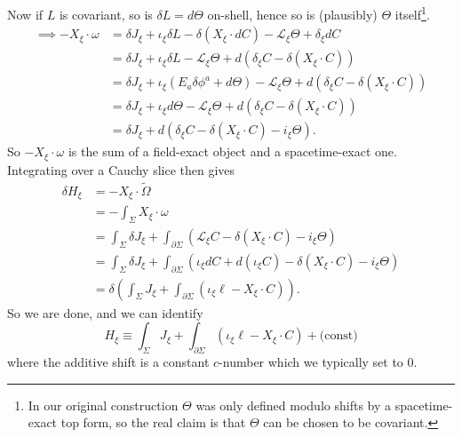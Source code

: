 \documentclass[11pt,letterpaper]{article}
\newcommand{\LP}{\left(}
\newcommand{\RP}{\right)}
\newcommand{\mc}[1]{\mathcal{#1}}
\newcommand{\D}{\partial}
\begin{document}
Now if $L$ is covariant, so is $\delta L = d \Theta$ on-shell, hence so is (plausibly) $\Theta$ itself\footnote{In our original construction $\Theta$ was only defined modulo shifts by a spacetime-exact top form, so the real claim is that $\Theta$ can be chosen to be covariant.}. \begin{equation}
\begin{aligned}
\implies - X_\xi \cdot \omega & = \delta J_\xi + \iota_\xi \delta L - \delta (X_\xi \cdot dC) - \mc{L}_\xi \Theta + \delta_\xi dC \\
& = \delta J_\xi + \iota_\xi \delta L - \mc{L}_\xi \Theta + d \LP \delta_\xi C - \delta (X_\xi \cdot C) \RP \\
& = \delta J_\xi + \iota_\xi (E_a \delta \phi^a + d \Theta) - \mc{L}_\xi \Theta + d \LP \delta_\xi C - \delta (X_\xi \cdot C) \RP \\
& = \delta J_\xi + \iota_\xi  d \Theta - \mc{L}_\xi \Theta + d \LP \delta_\xi C - \delta (X_\xi \cdot C) \RP \\
& = \delta J_\xi + d \LP \delta_\xi C - \delta (X_\xi \cdot C) - i_\xi \Theta \RP.
\end{aligned}
\end{equation}
So $- X_\xi \cdot \omega$ is the sum of a field-exact object and a spacetime-exact one. Integrating over a Cauchy slice then gives \begin{equation}
\begin{aligned}
\delta H_\xi & = - X_\xi \cdot \tilde{\Omega} \\
& = - \int_\Sigma X_\xi \cdot \omega \\
& = \int_\Sigma \delta J_\xi + \int_{\D \Sigma} \LP  \mc{L}_\xi C - \delta (X_\xi \cdot C) - i_\xi \Theta \RP \\
& = \int_\Sigma \delta J_\xi + \int_{\D \Sigma} \LP  \iota_\xi d C + d (\iota_\xi C) - \delta (X_\xi \cdot C) - i_\xi \Theta \RP \\
& = \delta \LP \int_\Sigma J_\xi + \int_{\D \Sigma} \LP  \iota_\xi \ell - X_\xi \cdot C \RP \RP.
\end{aligned}
\end{equation}
So we are done, and we can identify \begin{equation}
H_\xi \equiv  \int_\Sigma J_\xi + \int_{\D \Sigma} \LP  \iota_\xi \ell - X_\xi \cdot C \RP + \mbox{(const)}
\end{equation}
where the additive shift is a constant $c$-number which we typically set to $0$.
\end{document}
